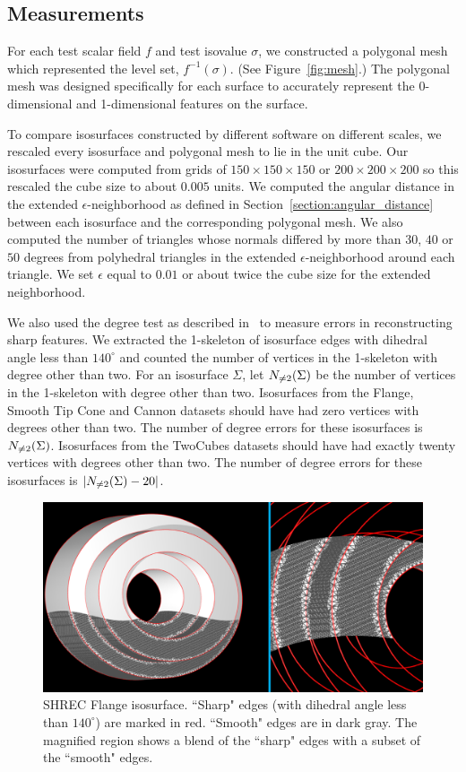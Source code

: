 \subsection{Measurements}
\label{section:measure}

For each test scalar field $f$ and test isovalue $\sigma$,
we constructed a polygonal mesh which represented the level set,
$f^{-1}(\sigma)$.
(See Figure~\ref{fig:mesh}.)
The polygonal mesh was designed specifically for each surface
to accurately represent the 0-dimensional and 1-dimensional features
on the surface.

To compare isosurfaces constructed by different software on different scales,
we rescaled every isosurface and polygonal mesh to lie in the unit cube.
Our isosurfaces were computed from grids 
of $150 \times 150 \times 150$ or $200 \times 200 \times 200$
so this rescaled the cube size to about $0.005$ units.
We computed the angular distance in the extended $\epsilon$-neighborhood
as defined in Section~\ref{section:angular_distance}
between each isosurface and the corresponding polygonal mesh.
We also computed the number of triangles whose normals differed
by more than $30$, $40$ or $50$ degrees from polyhedral triangles
in the extended $\epsilon$-neighborhood around each triangle.
We set $\epsilon$ equal to $0.01$ or about twice the cube size
for the extended neighborhood.

We also used the degree test as described in~\cite{bw-cisec-13}
to measure errors in reconstructing sharp features.
We extracted the 1-skeleton of isosurface edges with dihedral angle 
less than $140^\circ$ and counted the number of vertices in the 1-skeleton
with degree other than two.
For an isosurface $\Sigma$,
let $N_{\neq 2}(\Sigma)$ be the number of vertices in the 1-skeleton
with degree other than two.
Isosurfaces from the Flange, Smooth Tip Cone and Cannon datasets
should have had zero vertices with degrees other than two.
The number of degree errors for these isosurfaces is $N_{\neq 2}(\Sigma)$.
Isosurfaces from the TwoCubes datasets should have had exactly
twenty vertices with degrees other than two.
The number of degree errors for these isosurfaces is $|N_{\neq 2}(\Sigma)-20|$.

\begin{figure}[t]
\includegraphics[width=\linewidth]{images/shrecFlangeCombine2.eps}
\caption{SHREC Flange isosurface. ``Sharp" edges (with dihedral angle less than $140^\circ$) are marked in red. 
``Smooth" edges are in dark gray. The magnified region shows a blend of the ``sharp" edges with a subset of the ``smooth" edges.}
\label{fig:flange1}
\end{figure}

